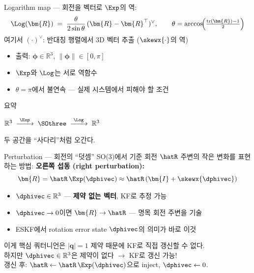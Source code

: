 \begin{frame}{Logarithm map — 회전을 벡터로}
  $\Exp$의 역:
  \[
    \Log(\bm{R}) \;=\; \frac{\theta}{2\sin\theta}\,(\bm{R} - \bm{R}^\top)^\vee,
    \qquad \theta = \arccos\!\Bigl(\tfrac{\mathrm{tr}(\bm{R})-1}{2}\Bigr)
  \]
  여기서 $(\cdot)^\vee$: 반대칭 행렬에서 3D 벡터 추출 ($\skewx{\cdot}$의 역)
  \vspace{0.4em}
  \begin{itemize}
    \item 출력: $\bm{\phi} \in \mathbb{R}^3$, \quad $\|\bm{\phi}\| \in [0, \pi]$
    \item $\Exp$와 $\Log$는 서로 역함수
    \item $\theta = \pi$에서 불연속 — 실제 시스템에서 피해야 할 조건
  \end{itemize}
  \pause
  \begin{block}{요약}
    \begin{center}
    $\mathbb{R}^3 \;\xrightarrow{\;\Exp\;}\; \SOthree \;\xrightarrow{\;\Log\;}\; \mathbb{R}^3$
    \end{center}
    두 공간을 ``사다리''처럼 오간다.
  \end{block}
\end{frame}

\begin{frame}{Perturbation — 회전의 ``덧셈''}
  SO(3)에서 기준 회전 $\hatR$ 주변의 작은 변화를 표현하는 방법:
  \vspace{0.4em}
  \textbf{오른쪽 섭동 (right perturbation):}
  \[
    \bm{R} = \hatR\, \Exp(\dphivec) \approx \hatR\,(\bm{I} + \skewx{\dphivec})
  \]
  \pause
  \vspace{0.3em}
  \begin{itemize}
    \item $\dphivec \in \mathbb{R}^3$ — \textbf{제약 없는 벡터}, KF로 추정 가능
    \item $\dphivec \to 0$이면 $\bm{R} \to \hatR$ — 명목 회전 주변을 기술
    \item ESKF에서 rotation error state $\dphivec$의 의미가 바로 이것
  \end{itemize}
  \pause
  \vspace{0.4em}
  \begin{alertblock}{이게 핵심}
    쿼터니언은 $|\mathbf{q}|=1$ 제약 때문에 KF로 직접 갱신할 수 없다. \\
    하지만 $\dphivec \in \mathbb{R}^3$은 제약이 없다 $\rightarrow$ KF로 갱신 가능! \\
    갱신 후: $\hatR \leftarrow \hatR\,\Exp(\dphivec)$으로 inject, $\dphivec \leftarrow 0$.
  \end{alertblock}
\end{frame}

